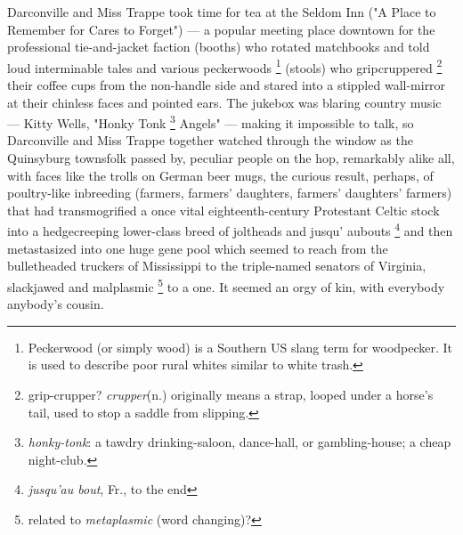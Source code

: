   Darconville and Miss Trappe took time for tea at the Seldom Inn ("A Place to
Remember for Cares to Forget") --- a popular meeting place downtown for the
professional tie-and-jacket faction (booths) who rotated matchbooks and told
loud interminable tales and various peckerwoods 
\footnote{ Peckerwood (or simply wood) is a Southern US slang term for
  woodpecker. It is used to describe poor rural whites similar to white trash.}
(stools) who gripcruppered 
\footnote{ \textdbend grip-crupper? \textit{crupper}(n.) originally means a
  strap, looped under a horse's tail, used to stop a saddle from slipping.}
their coffee cups from the non-handle side and stared into a stippled 
wall-mirror at their chinless faces and pointed ears. The jukebox 
was blaring 
country music --- Kitty Wells, "Honky Tonk 
\footnote{ \textit{honky-tonk}: a tawdry drinking-saloon, dance-hall, or 
  gambling-house; a cheap night-club.}
Angels" --- making it impossible to talk, so
Darconville and Miss Trappe together watched through the window as the
Quinsyburg townsfolk passed by, peculiar people on the hop, 
remarkably alike all, with faces like the trolls on German beer mugs, 
the curious result, perhaps, of poultry-like 
inbreeding (farmers, farmers' daughters, farmers' daughters' farmers) 
that had transmogrified 
a once vital eighteenth-century Protestant Celtic stock into a hedgecreeping 
lower-class breed of joltheads 
and jusqu' aubouts
\footnote{ \textdbend \textit{jusqu'au bout}, Fr., to the end }
and then metastasized 
into one huge gene pool which seemed to reach from the bulletheaded truckers 
of Mississippi to the triple-named senators of Virginia, slackjawed 
and malplasmic 
\footnote{\textdbend related to \textit{metaplasmic} (word changing)?}
to a one. It seemed an orgy of kin, with everybody anybody's cousin.

